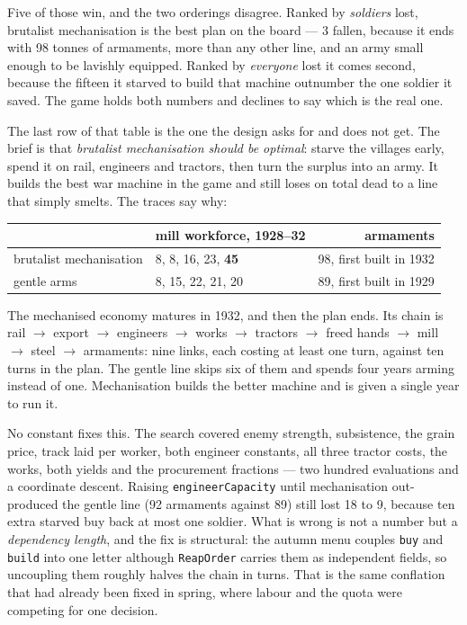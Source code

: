 \documentclass[11pt,a4paper]{article}
\begin{document}
\noindent Five of those win, and the two orderings disagree. Ranked by
\emph{soldiers} lost, brutalist mechanisation is the best plan on the board ---
3 fallen, because it ends with 98 tonnes of armaments, more than any other
line, and an army small enough to be lavishly equipped. Ranked by
\emph{everyone} lost it comes second, because the fifteen it starved to build
that machine outnumber the one soldier it saved. The game holds both numbers
and declines to say which is the real one.

The last row of that table is the one the design asks for and does not get.
The brief is that \emph{brutalist mechanisation should be optimal}: starve the
villages early, spend it on rail, engineers and tractors, then turn the surplus
into an army. It builds the best war machine in the game and still loses on
total dead to a line that simply smelts. The traces say why:

\begin{center}
\begin{tabular}{llr}
\toprule
 & mill workforce, 1928--32 & armaments \\
\midrule
brutalist mechanisation & 8, 8, 16, 23, \textbf{45} & 98, first built in 1932 \\
gentle arms             & 8, 15, 22, 21, 20        & 89, first built in 1929 \\
\bottomrule
\end{tabular}
\end{center}

\noindent The mechanised economy matures in 1932, and then the plan ends. Its
chain is rail $\to$ export $\to$ engineers $\to$ works $\to$ tractors $\to$
freed hands $\to$ mill $\to$ steel $\to$ armaments: nine links, each costing at
least one turn, against ten turns in the plan. The gentle line skips six of
them and spends four years arming instead of one. Mechanisation builds the
better machine and is given a single year to run it.

No constant fixes this. The search covered enemy strength, subsistence, the
grain price, track laid per worker, both engineer constants, all three tractor
costs, the works, both yields and the procurement fractions --- two hundred
evaluations and a coordinate descent. Raising \verb|engineerCapacity| until
mechanisation out-produced the gentle line (92 armaments against 89) still lost
18 to 9, because ten extra starved buy back at most one soldier. What is wrong
is not a number but a \emph{dependency length}, and the fix is structural: the
autumn menu couples \verb|buy| and \verb|build| into one letter although
\verb|ReapOrder| carries them as independent fields, so uncoupling them roughly
halves the chain in turns. That is the same conflation that had already been
fixed in spring, where labour and the quota were competing for one decision.
\end{document}
